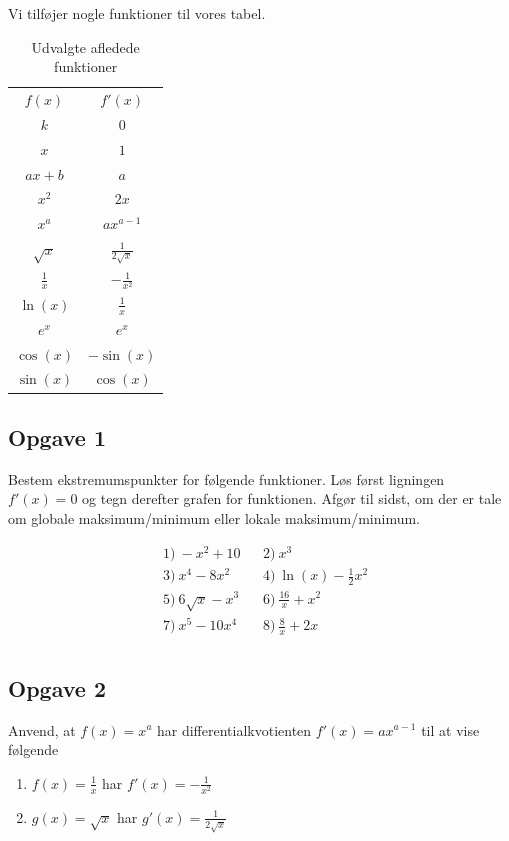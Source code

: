 Vi tilføjer nogle funktioner til vores tabel.
\begin{table}[H]
	\centering
	\begin{tabular}{cc}
		$f(x)$ & $f'(x)$ \\
		$k$ & $0$ \\
		$x$ & $1$ \\
		$ax + b$  & $a$ \\
		$x^2$ & $2x$ \\
		$x^a$ & $ax^{a-1} $ \\
		$\sqrt{x}$ & $\frac{1}{2\sqrt{x}}$ \\
		$\frac{1}{x}$ & $-\frac{1}{x^2}$ \\
		$\ln(x)$ & $\frac{1}{x}$ \\
	 	$e^x$ & $e^x$ \\
	 	$\cos(x)$ & $-\sin(x)$ \\
	 	$\sin(x)$ & $\cos(x)$ \\
	\end{tabular}
	\caption{Udvalgte afledede funktioner}
	\label{tab:afledt}
\end{table}





\subsection*{Opgave 1}

Bestem ekstremumspunkter for følgende funktioner. Løs først ligningen $f'(x)=0$ og tegn derefter grafen for funktionen.  Afgør til sidst, om der er tale om globale maksimum/minimum eller lokale maksimum/minimum.

\begin{align*}
	&1) \ -x^2+10    &&2) \  x^3     \\
	&3) \  x^4-8x^2   &&4) \ \ln(x) - \frac{1}{2}x^2      \\
	&5) \ 6\sqrt{x}-x^3    &&6) \   \frac{16}{x} +x^2    \\
	&7) \  x^5-10x^4   &&8) \ \frac{8}{x} + 2x      \\
\end{align*}
\subsection*{Opgave 2}
Anvend, at $f(x) = x^a$ har differentialkvotienten $f'(x) = ax^{a-1}$ til at vise følgende
\begin{enumerate}[label=\roman*)]
	\item $f(x) = \frac{1}{x}$ har $f'(x) = -\frac{1}{x^2}$
	\item $g(x) = \sqrt{x}$ har $g'(x) = \frac{1}{2\sqrt{x}}$
\end{enumerate}

